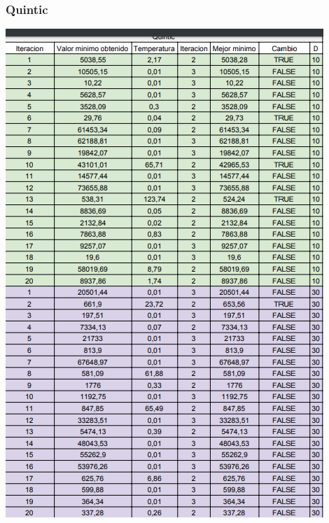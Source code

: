 \documentclass[10pt]{article}
\begin{document}
\subsubsection{Quintic}
\begin{center}
  \includegraphics[scale=0.5]{imgs/quintic.png}
\end{center}
\end{document}
